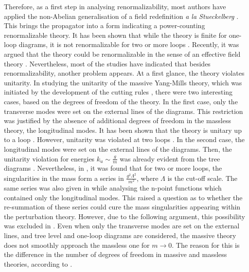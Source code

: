 \documentclass{article}
\begin{document}
Therefore, as a first step in analysing renormalizability, most authors have applied the non-Abelian generalisation of a field redefinition \textit{a la Stueckelberg} \cite{Stueckelberg, Kunimasa}. This brings the propagator into a form indicating a power-counting renormalizable theory. It has been shown that while the theory is finite for one-loop diagrams, it is not renormalizable for two or more loops \cite{SalamKomar, UmezawaKamefuchi, Ionides, Salam, Boulware, Veltman1970}. Recently, it was argued that the theory could be renormalizable in the sense of an effective field theory \cite{Gegelia}. Nevertheless, most of the studies have indicated that besides renormalizability, another problem appears. At a first glance, the theory violates unitarity. In studying the unitarity of the massive Yang-Mills theory, which was initiated by the development of the cutting rules \cite{cuttingrules, Cutkosky}, there were two interesting cases, based on the degrees of freedom of the theory. In the first case, only the transverse modes were set on the external lines of the diagrams. This restriction was justified by the absence of additional degrees of freedom in the massless theory, the longitudinal modes. It has been shown that the theory is unitary up to a loop \cite{Veltman1968}. However, unitarity was violated at two loops \cite{VeltmanReiff}. In the second case, the longitudinal modes were set on the external lines of the diagrams. Then, the unitarity violation for energies $k_u\sim\frac{g}{m}$ was already evident from the tree diagrams \cite{Vainshtein, Bell, Cornwall, Smith}. Nevertheless, in \cite{Veltman1970}, it was found that for two or more loops, the singularities in the mass form a series in $\frac{g^2\Lambda^2}{m^2}$, where $\Lambda$ is the cut-off scale. The same series was also given in \cite{Veltman1968} while analysing the n-point functions which contained only the longitudinal modes. This raised a question as to whether the re-summation of these series could cure the mass singularities appearing within the perturbation theory. However, due to the following argument, this possibility was excluded in \cite{vDVZ}. Even when only the transverse modes are set on the external lines, and tree level and one-loop diagrams are considered, the massive theory does not smoothly approach the massless one for $m\to0$\cite{vDVZ, SlavFad, Wong}. The reason for this is the difference in the number of degrees of freedom in massive and massless theories, according to \cite{vDVZ}. 
\end{document}
